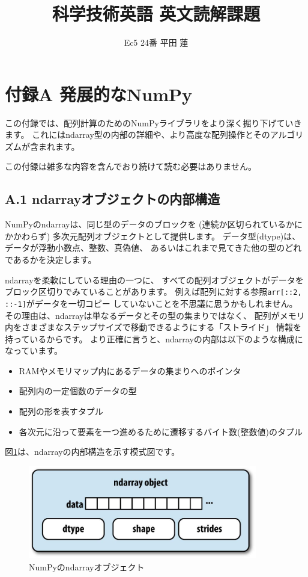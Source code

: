 \documentclass{jsarticle}
\title{科学技術英語 英文読解課題}
\author{Ec5 24番 平田 蓮}
\date{}
\begin{document}
\maketitle
\section*{付録A 発展的なNumPy}
    この付録では、配列計算のためのNumPyライブラリをより深く掘り下げていきます。
    これにはndarray型の内部の詳細や、より高度な配列操作とそのアルゴリズムが含まれます。

    この付録は雑多な内容を含んでおり続けて読む必要はありません。

    \subsection*{A.1 ndarrayオブジェクトの内部構造}
        NumPyのndarrayは、同じ型のデータのブロックを
        (連続か区切られているかにかかわらず)
        多次元配列オブジェクトとして提供します。
        データ型(dtype)は、データが浮動小数点、整数、真偽値、
        あるいはこれまで見てきた他の型のどれであるかを決定します。

        ndarrayを柔軟にしている理由の一つに、
        すべての配列オブジェクトがデータをブロック区切りでみていることがあります。
        例えば配列に対する参照\verb|arr[::2, ::-1]|がデータを一切コピー
        していないことを不思議に思うかもしれません。
        その理由は、ndarrayは単なるデータとその型の集まりではなく、
        配列がメモリ内をさまざまなステップサイズで移動できるようにする「ストライド」
        情報を持っているからです。
        より正確に言うと、ndarrayの内部は以下のような構成になっています。

        \begin{itemize}
            \item RAMやメモリマップ内にあるデータの集まりへのポインタ
            \item 配列内の一定個数のデータの型
            \item 配列の形を表すタプル
            \item 各次元に沿って要素を一つ進めるために遷移するバイト数(整数値)のタプル
        \end{itemize}

        図\ref{fig:A-1}は、ndarrayの内部構造を示す模式図です。

        \begin{figure}[h]
            \centering
            \includegraphics[width=10cm]{images/A-1.jpg}
            \caption{NumPyのndarrayオブジェクト}
            \label{fig:A-1}
        \end{figure}
\end{document}
